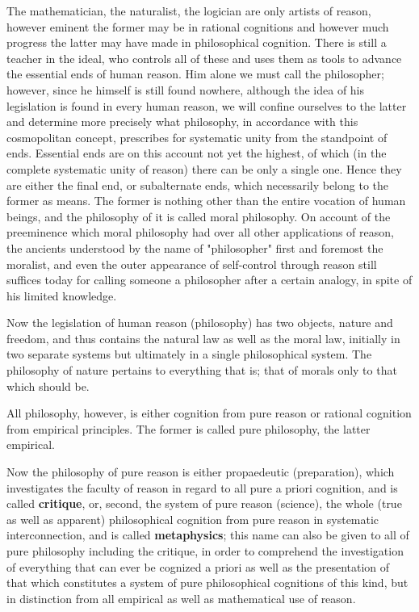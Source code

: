 \documentclass{article}
\begin{document}
The mathematician, the naturalist, the logician are only artists of reason, 
however eminent the former may be in rational cognitions and
however much progress the latter may have made in philosophical cognition.
There is still a teacher in the ideal, who controls all of these
and uses them as tools to advance the essential ends of human reason.
Him alone we must call the philosopher;
however, since he himself is still found nowhere,
although the idea of his legislation is found in every human reason, 
we will confine ourselves to the latter
and determine more precisely what philosophy, 
in accordance with this cosmopolitan concept, 
prescribes for systematic unity from the standpoint of ends.
Essential ends are on this account not yet the highest, 
of which (in the complete systematic unity of reason) 
there can be only a single one.
Hence they are either the final end, or subalternate ends,
which necessarily belong to the former as means.
The former is nothing other than the entire vocation of human beings, 
and the philosophy of it is called moral philosophy.
On account of the preeminence which moral philosophy had
over all other applications of reason, the ancients understood
by the name of "philosopher" first and foremost the moralist,
and even the outer appearance of self-control through reason still suffices today
for calling someone a philosopher after a certain analogy, 
in spite of his limited knowledge.

Now the legislation of human reason (philosophy) has two objects,
nature and freedom,
and thus contains the natural law as well as the moral law, 
initially in two separate systems
but ultimately in a single philosophical system.
The philosophy of nature pertains to everything that is;
that of morals only to that which should be.

All philosophy, however, is either cognition from pure reason
or rational cognition from empirical principles.
The former is called pure philosophy, the latter empirical. 

Now the philosophy of pure reason is either propaedeutic (preparation),
which investigates the faculty of reason in regard to all pure a priori cognition,
and is called \textbf{critique},
or, second, the system of pure reason (science),
the whole (true as well as apparent) philosophical cognition
from pure reason in systematic interconnection,
and is called \textbf{metaphysics};
this name can also be given to all of pure philosophy including the critique,
in order to comprehend the investigation of everything that can ever be cognized a priori
as well as the presentation of that which constitutes
a system of pure philosophical cognitions of this kind,
but in distinction from all empirical as well as mathematical use of reason.
\end{document}
